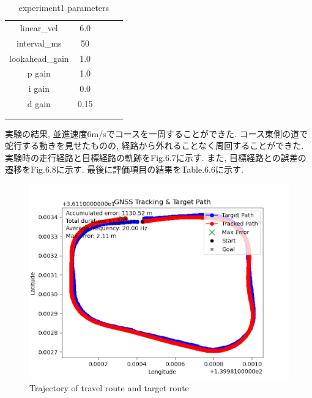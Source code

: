 \begin{table}[H]
     \centering
     \caption{experiment1 parameters}
     \begin{tabular}{cclll}
     \multicolumn{1}{c|}{linear\_vel}     & 6.0  &  &  &  \\
     \multicolumn{1}{c|}{interval\_ms}    & 50   &  &  &  \\
     \multicolumn{1}{c|}{lookahead\_gain} & 1.0  &  &  &  \\
     \multicolumn{1}{c|}{p gain}          & 1.0  &  &  &  \\
     \multicolumn{1}{c|}{i gain}          & 0.0  &  &  &  \\
     \multicolumn{1}{c|}{d gain}          & 0.15 &  &  &  \\
     \multicolumn{1}{l}{}                 &      &  &  &  \\
     \multicolumn{1}{l}{}                 &      &  &  & 
     \end{tabular}
\end{table}

実験の結果, 並進速度6m/sでコースを一周することができた.
コース東側の道で蛇行する動きを見せたものの, 経路から外れることなく周回することができた.
実験時の走行経路と目標経路の軌跡をFig.6.7に示す.
また, 目標経路との誤差の遷移をFig.6.8に示す.
最後に評価項目の結果をTable.6.6に示す.

\begin{figure}[H]
     \centering
    \includegraphics[keepaspectratio, scale=0.7]
         {images/6mspath2.png}
    \caption{Trajectory of travel route and target route}
    \label{fig:path}
\end{figure}

